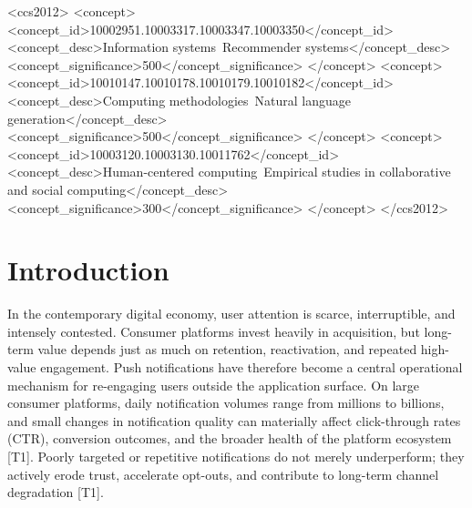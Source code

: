 \documentclass[sigconf]{acmart}
\begin{document}
\begin{CCSXML}
<ccs2012>
   <concept>
       <concept_id>10002951.10003317.10003347.10003350</concept_id>
       <concept_desc>Information systems~Recommender systems</concept_desc>
       <concept_significance>500</concept_significance>
       </concept>
   <concept>
       <concept_id>10010147.10010178.10010179.10010182</concept_id>
       <concept_desc>Computing methodologies~Natural language generation</concept_desc>
       <concept_significance>500</concept_significance>
       </concept>
   <concept>
       <concept_id>10003120.10003130.10011762</concept_id>
       <concept_desc>Human-centered computing~Empirical studies in collaborative and social computing</concept_desc>
       <concept_significance>300</concept_significance>
       </concept>
 </ccs2012>
\end{CCSXML}



\maketitle

\section{Introduction}

In the contemporary digital economy, user attention is scarce, interruptible, and intensely contested. Consumer platforms invest heavily in acquisition, but long-term value depends just as much on retention, reactivation, and repeated high-value engagement. Push notifications have therefore become a central operational mechanism for re-engaging users outside the application surface. On large consumer platforms, daily notification volumes range from millions to billions, and small changes in notification quality can materially affect click-through rates (CTR), conversion outcomes, and the broader health of the platform ecosystem \cite{bie2026pushgen} [T1]. Poorly targeted or repetitive notifications do not merely underperform; they actively erode trust, accelerate opt-outs, and contribute to long-term channel degradation \cite{ohly2023effects} [T1].
\end{document}
